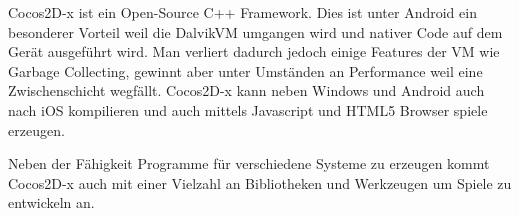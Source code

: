 Cocos2D-x ist ein Open-Source C++ Framework. Dies ist unter Android ein besonderer Vorteil weil die DalvikVM umgangen wird und nativer Code auf dem Gerät ausgeführt wird.
Man verliert dadurch jedoch einige Features der VM wie Garbage Collecting, gewinnt aber unter Umständen an Performance weil eine Zwischenschicht wegfällt.
Cocos2D-x kann neben Windows und Android auch nach iOS kompilieren und auch mittels Javascript und HTML5 Browser spiele erzeugen.

Neben der Fähigkeit Programme für verschiedene Systeme zu erzeugen kommt Cocos2D-x auch mit einer Vielzahl an Bibliotheken und Werkzeugen um Spiele zu entwickeln an.